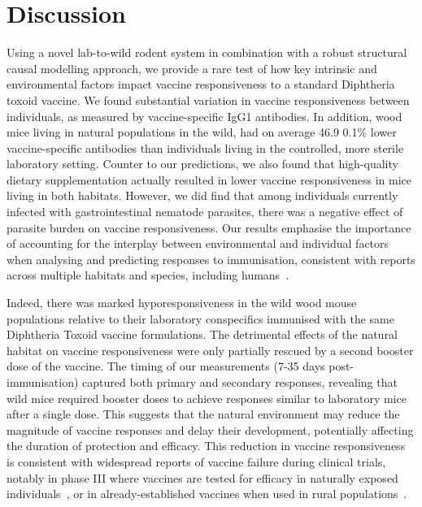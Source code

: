\documentclass[a4paper, hidelinks, 11pt]{article}
\begin{document}
\section{Discussion}

Using a novel lab-to-wild rodent system in combination with a robust structural causal modelling approach, we provide a rare test of how key intrinsic and environmental factors impact vaccine responsiveness to a standard Diphtheria toxoid vaccine.  We found substantial variation in vaccine responsiveness between individuals, as measured by vaccine-specific IgG1 antibodies. In addition, wood mice living in natural populations in the wild, had on average 46.9 \pm{} 0.1\% lower vaccine-specific antibodies than individuals living in the controlled, more sterile laboratory setting. Counter to our predictions, we also found that high-quality dietary supplementation actually resulted in lower vaccine responsiveness in mice living in both habitats.
However, we did find that among individuals currently infected with gastrointestinal nematode parasites, there was a negative effect of parasite burden on vaccine responsiveness. Our results emphasise the importance of accounting for the interplay between environmental and individual factors when analysing and predicting responses to immunisation, consistent with reports across multiple habitats and species, including humans~\cite{Zimmermann2019, VanLoveren2001, Kampmann2015, Edwards2018}.

Indeed, there was marked hyporesponsiveness in the  wild wood mouse populations relative to their laboratory conspecifics immunised with the same Diphtheria Toxoid vaccine formulations. The detrimental effects of the natural habitat on vaccine responsiveness were only partially rescued by a second booster dose of the vaccine. The timing of our measurements (7-35 days post-immunisation) captured both primary and secondary responses, revealing that wild mice required booster doses to achieve responses similar to laboratory mice after a single dose. This suggests that the natural environment may reduce the magnitude of vaccine responses and delay their development, potentially affecting the duration of protection and efficacy. This reduction in vaccine responsiveness is consistent with widespread reports of vaccine failure during clinical trials, notably in phase III where vaccines are tested for efficacy in naturally exposed individuals~\cite{Pronker2013}, or in already-established vaccines when used in rural populations~\cite{vanDorst2024, vanRiet2007a}.
\end{document}
